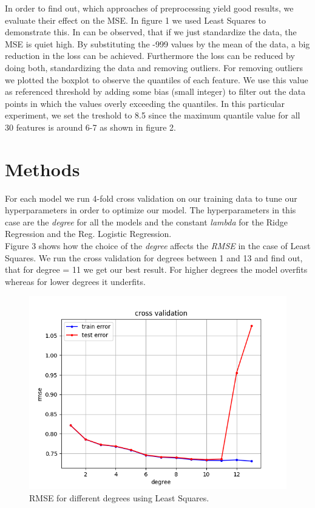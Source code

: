 \documentclass[10pt,conference,compsocconf]{IEEEtran}
\begin{document}
In order to find out, which approaches of preprocessing yield good results, we evaluate their effect on the MSE. In figure 1 we used Least Squares to demonstrate this. In can be observed, that if we just standardize the data, the MSE is quiet high. 
By substituting the -999 values by the mean of the data, a big reduction in the loss can be achieved. Furthermore the loss can be reduced by doing both, standardizing the data and removing outliers. For removing outliers we plotted the boxplot to observe the quantiles of each feature. We use this value as referenced threshold by adding some bias (small integer) to filter out the data points in which the values overly exceeding the quantiles. In this particular experiment, we set the treshold to 8.5 since the maximum quantile value for all 30 features is around 6-7 as shown in figure 2.\\



\section{Methods}
\label{sec:tips-writing}


For each model we run 4-fold cross validation on our training data to tune our hyperparameters in order to optimize our model. The hyperparameters in this case are the \textit{degree} for all the models and the constant \textit{lambda} for the Ridge Regression and the Reg. Logistic Regression.
\\
Figure 3 shows how the choice of the \textit{degree} affects the \textit{RMSE} in the case of Least Squares. We run the cross validation for degrees between 1 and 13 and find out, that for degree = 11 we get our best result. For higher degrees the model overfits whereas for lower degrees it underfits.

\begin{figure}[htbp]
  \centering
  \includegraphics[width=\columnwidth]{cross_validation_leastsquares.png}
  \caption{RMSE for different degrees using Least Squares.}
  \vspace{-3mm}
  \label{fig:crossvalidationleastsquares}
\end{figure}
\end{document}
